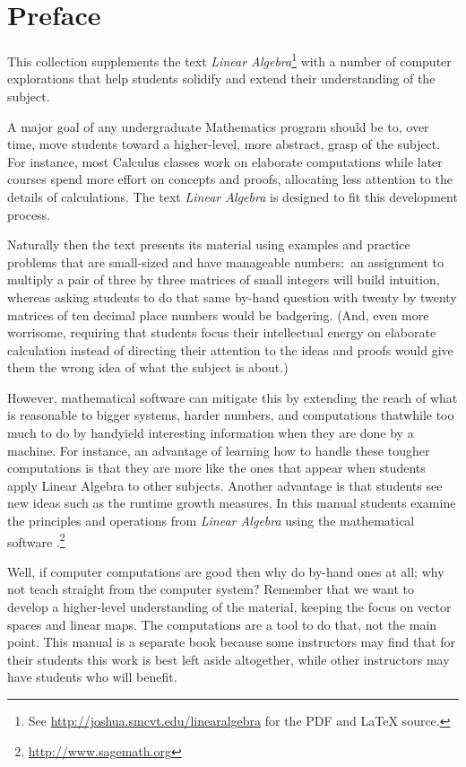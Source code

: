 \chapter*{Preface}\pagestyle{preface}\thispagestyle{preface}


This collection supplements the text \nocite{Hefferon12}
\textit{Linear Algebra}\footnote{See \protect\url{http://joshua.smcvt.edu/linearalgebra} for the PDF and \protect\LaTeX{} source.}
with a number of computer explorations that help students
solidify and extend their understanding of the subject.

A major goal of any undergraduate Mathematics program should be to,
over time, move students 
toward a higher-level, more abstract, grasp of the subject.
For instance, most Calculus classes work on elaborate computations
while later courses spend more effort on concepts and proofs, allocating 
less attention to the details of calculations.  
The text \textit{Linear Algebra} is designed to fit 
this development process.

Naturally then the text presents its material 
using examples and practice problems
that are small-sized and have manageable numbers:~an 
assignment to multiply a pair of three by three matrices
of small integers will build intuition, whereas asking students to do that same 
by-hand question with twenty by twenty matrices
of ten decimal place numbers would be badgering. 
(And, even more worrisome, requiring that students  
focus their intellectual energy on elaborate calculation instead of directing
their attention to the ideas and proofs would give them the wrong idea of
what the subject is about.)

However, mathematical software can mitigate this by extending the reach of
what is reasonable
to bigger systems, harder numbers, and computations 
that\Dash while too much to do by hand\Dash yield
interesting information when they are done by a machine.
For instance, an advantage of learning how to handle these 
tougher computations is that 
they are more like the ones that appear when students apply Linear 
Algebra to other subjects.
Another advantage is that students see new ideas such as 
the runtime growth measures.
In this manual students examine the principles and operations 
from \textit{Linear Algebra} using 
the mathematical software \Sage{}.\footnote{\url{http://www.sagemath.org}}

Well, if computer computations are good then why do by-hand ones at all; why 
not teach straight from the computer system?
Remember that we want to develop a higher-level understanding of the 
material, 
keeping the focus on vector spaces and linear maps.
The computations are a tool to do that, not the main point.
This manual is a separate book because some instructors may find 
that for their students
this work is best left aside altogether, 
while other instructors may have students who
will benefit.


